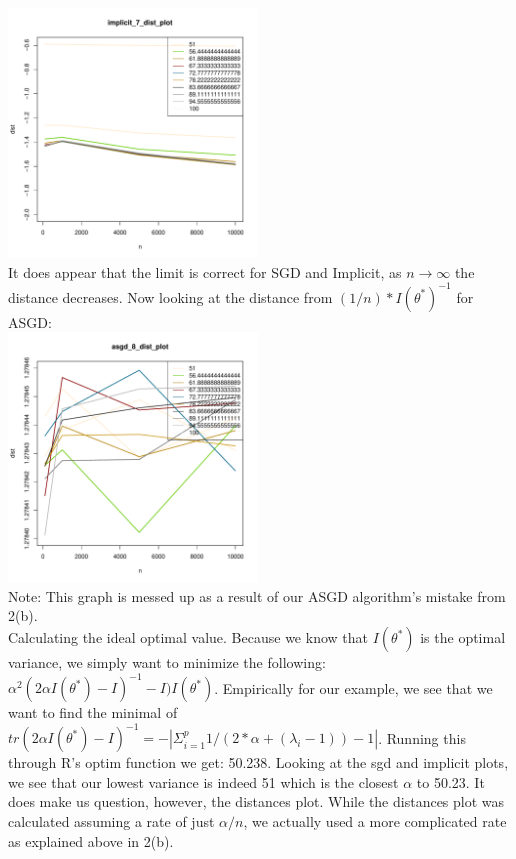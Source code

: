 \documentclass[paper=a4, fontsize=11pt]{scrartcl}
\begin{document}
\begin{enumerate}
\begin{enumerate}[(a)]
        \includegraphics[width=250px, clip=true]{implicit_7_dist_plot.pdf} \\
        It does appear that the limit is correct for SGD and Implicit, as $n \rightarrow \infty$ the distance decreases. Now looking at the distance from $(1/n)*I(\theta^*)^{-1}$ for ASGD: \\
        \includegraphics[width=250px, clip=true]{asgd_8_dist_plot.pdf} \\
        Note: This graph is messed up as a result of our ASGD algorithm's mistake from 2(b). \\
        Calculating the ideal optimal value. Because we know that $I(\theta^*)$ is the optimal variance, we simply want to minimize the following: $\alpha^2(2\alpha I(\theta^*) - I)^{-1} - I)I(\theta^*)$. Empirically for our example, we see that we want to find the minimal of $tr(2\alpha I(\theta^*) - I)^{-1} = -|\Sigma_{i=1}^p{1/(2*\alpha + (\lambda_i - 1))} - 1|$. Running this through R's optim function we get: 50.238. Looking at the sgd and implicit plots, we see that our lowest variance is indeed 51 which is the closest $\alpha$ to 50.23. It does make us question, however, the distances plot. While the distances plot was calculated assuming a rate of just $\alpha/n$, we actually used a more complicated rate as explained above in 2(b).

\end{enumerate}
\end{enumerate}
\end{document}
